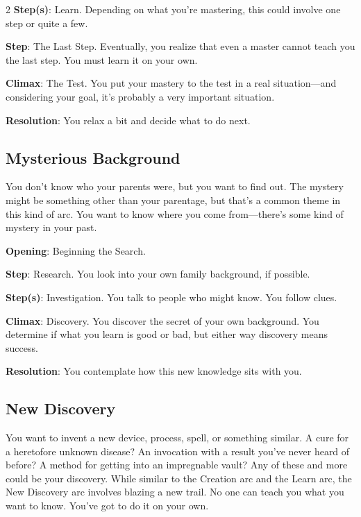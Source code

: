 \begin{multicols}{2}
\textbf{Step(s)}: Learn. Depending on what you’re mastering, this could involve one step or quite a few.

\textbf{Step}: The Last Step. Eventually, you realize that even a master cannot teach you the last step. You must learn it on your own.

\textbf{Climax}: The Test. You put your mastery to the test in a real situation—and considering your goal, it’s probably a very important situation.

\textbf{Resolution}: You relax a bit and decide what to do next.

\subsection{Mysterious Background}

You don’t know who your parents were, but you want to find out. The mystery might be something other than your parentage, but that’s a common theme in this kind of arc. You want to know where you come from—there’s some kind of mystery in your past. 

\textbf{Opening}: Beginning the Search.

\textbf{Step}: Research. You look into your own family background, if possible.

\textbf{Step(s)}: Investigation. You talk to people who might know. You follow clues.

\textbf{Climax}: Discovery. You discover the secret of your own background. You determine if what you learn is good or bad, but either way discovery means success.

\textbf{Resolution}: You contemplate how this new knowledge sits with you.

\subsection{New Discovery}

You want to invent a new device, process, spell, or something similar. A cure for a heretofore unknown disease? An invocation with a result you’ve never heard of before? A method for getting into an impregnable vault? Any of these and more could be your discovery. While similar to the Creation arc and the Learn arc, the New Discovery arc involves blazing a new trail. No one can teach you what you want to know. You’ve got to do it on your own.


\end{multicols}

